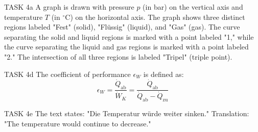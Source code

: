 TASK 4a  
A graph is drawn with pressure \( p \) (in bar) on the vertical axis and temperature \( T \) (in \( ^\circ \text{C} \)) on the horizontal axis. The graph shows three distinct regions labeled "Fest" (solid), "Flüssig" (liquid), and "Gas" (gas). The curve separating the solid and liquid regions is marked with a point labeled "1," while the curve separating the liquid and gas regions is marked with a point labeled "2." The intersection of all three regions is labeled "Tripel" (triple point).  

TASK 4d  
The coefficient of performance \( \epsilon_W \) is defined as:  
\[
\epsilon_W = \frac{\dot{Q}_{\text{ab}}}{\dot{W}_K} = \frac{\dot{Q}_{\text{ab}}}{\dot{Q}_{\text{ab}} - \dot{Q}_{\text{zu}}}
\]  

TASK 4e  
The text states:  
"Die Temperatur würde weiter sinken."  
Translation: "The temperature would continue to decrease."